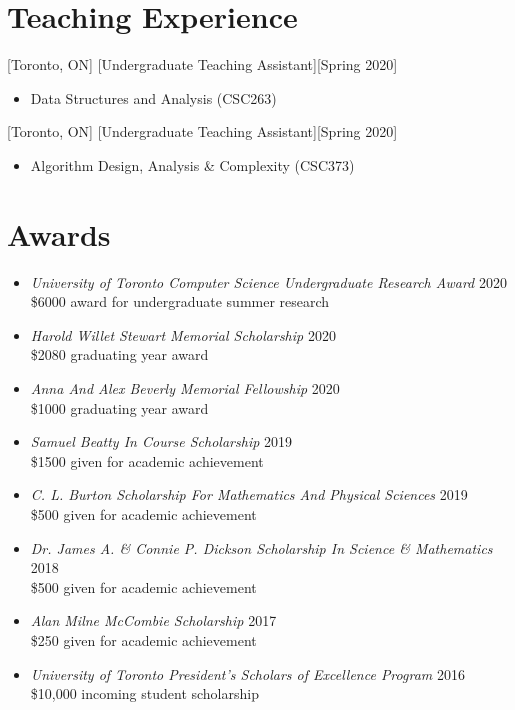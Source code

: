 \documentclass{article}
\begin{document}
    \section{Teaching Experience}
    [Toronto, ON]
    [Undergraduate Teaching Assistant][Spring 2020]
    \begin{itemize}
        \item Data Structures and Analysis (CSC263)
    \end{itemize}

    [Toronto, ON]
    [Undergraduate Teaching Assistant][Spring 2020]
    \begin{itemize}
        \item Algorithm Design, Analysis \& Complexity (CSC373)
    \end{itemize}


    \section{Awards}
    \begin{itemize}
        \item \textsl{University of Toronto Computer Science Undergraduate Research Award} \hfill 2020\\
        \$6000 award for undergraduate summer research
        \item \textsl{Harold Willet Stewart Memorial Scholarship} \hfill 2020\\
        \$2080 graduating year award
        \item \textsl{Anna And Alex Beverly Memorial Fellowship} \hfill 2020\\
        \$1000 graduating year award
        \item \textsl{Samuel Beatty In Course Scholarship} \hfill 2019\\
        \$1500 given for academic achievement
        \item \textsl{C. L. Burton Scholarship For Mathematics And Physical Sciences} \hfill 2019\\
        \$500 given for academic achievement
        \item \textsl{Dr. James A. \& Connie P. Dickson Scholarship In Science \& Mathematics} \hfill 2018\\
        \$500 given for academic achievement
        \item \textsl{Alan Milne McCombie Scholarship} \hfill 2017\\
        \$250 given for academic achievement
        \item \textsl{University of Toronto President's Scholars of Excellence Program} \hfill 2016\\
        \$10,000 incoming student scholarship
    \end{itemize}
\end{document}
